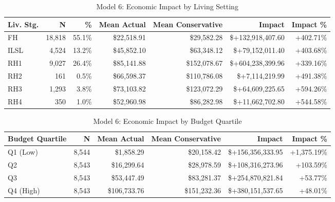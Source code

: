 \begin{table}[htbp]
\centering
\small
\caption{Model 6: Economic Impact by Living Setting}
\label{tab:model6_impact_living}
\begin{tabular}{lrrrrrr}
\toprule
\textbf{Liv. Stg.} & \textbf{N} & \textbf{\%} & \textbf{Mean Actual} & \textbf{Mean Conservative} & \textbf{Impact} & \textbf{Impact \%} \\
\midrule
FH & 18,818 & 55.1\% & \$22,518.91 & \$29,582.28 & \$+132,918,407.60 & +402.71\% \\
ILSL & 4,524 & 13.2\% & \$45,852.10 & \$63,348.12 & \$+79,152,011.40 & +403.68\% \\
RH1 & 9,027 & 26.4\% & \$85,141.88 & \$152,078.67 & \$+604,238,399.96 & +339.16\% \\
RH2 & 161 & 0.5\% & \$66,598.37 & \$110,786.08 & \$+7,114,219.99 & +491.38\% \\
RH3 & 1,293 & 3.8\% & \$73,103.82 & \$123,072.29 & \$+64,609,225.65 & +594.26\% \\
RH4 & 350 & 1.0\% & \$52,960.98 & \$86,282.98 & \$+11,662,702.80 & +544.58\% \\
\bottomrule
\end{tabular}
\end{table}

\begin{table}[htbp]
\centering
\small
\caption{Model 6: Economic Impact by Budget Quartile}
\label{tab:model6_impact_quartile}
\begin{tabular}{lrrrrr}
\toprule
\textbf{Budget Quartile} & \textbf{N} & \textbf{Mean Actual} & \textbf{Mean Conservative} & \textbf{Impact} & \textbf{Impact \%} \\
\midrule
Q1 (Low) & 8,544 & \$1,858.29 & \$20,158.42 & \$+156,356,333.95 & +1,375.19\% \\
Q2 & 8,543 & \$16,299.64 & \$28,978.59 & \$+108,316,273.96 & +103.59\% \\
Q3 & 8,543 & \$53,447.49 & \$83,281.37 & \$+254,870,821.84 & +53.77\% \\
Q4 (High) & 8,543 & \$106,733.76 & \$151,232.36 & \$+380,151,537.65 & +48.01\% \\
\bottomrule
\end{tabular}
\end{table}

